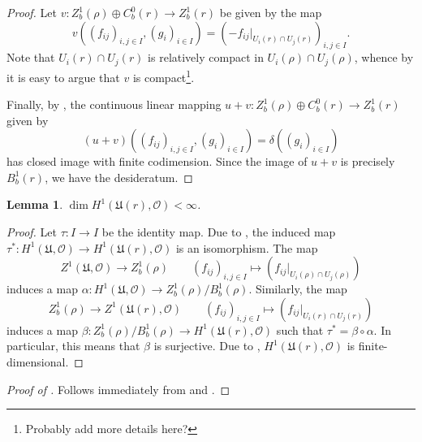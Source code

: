 \documentclass[10pt]{article}
\theoremstyle{thmstyle}
\newtheorem{lemma}[theorem]{Lemma}
\theoremstyle{defstyle}
\newcommand{\frakU}{\mathfrak{U}}
\newcommand{\scrO}{\mathscr{O}} %
\begin{document}
\begin{proof}
    Let $v: Z^1_b(\rho)\oplus C^0_b(r)\to Z^1_b(r)$ be given by the map 
    \begin{equation*}
        v\left((f_{ij})_{i,j\in I}, (g_i)_{i\in I}\right) = \left(-f_{ij}|_{U_i(r)\cap U_j(r)}\right)_{i,j\in I}.
    \end{equation*}
    Note that $U_i(r)\cap U_j(r)$ is relatively compact in $U_i(\rho)\cap U_j(\rho)$, whence by  it is easy to argue that $v$ is compact\footnote{Probably add more details here?}. 

    Finally, by , the continuous linear mapping $u + v : Z^1_b(\rho)\oplus C^0_b(r)\to Z^1_b(r)$ given by 
    \begin{equation*}
        (u + v)\left((f_{ij})_{i,j\in I}, (g_i)_{i\in I}\right) = \delta\left((g_i)_{i\in I}\right)
    \end{equation*}
    has closed image with finite codimension. Since the image of $u + v$ is precisely $B^1_b(r)$, we have the desideratum.
\end{proof}

\begin{lemma}
    $\dim H^1\left(\frakU(r),\scrO\right) < \infty$.
\end{lemma}
\begin{proof}
    Let $\tau: I\to I$ be the identity map. Due to , the induced map $\tau^\ast: H^1(\frakU,\scrO)\to H^1(\frakU(r),\scrO)$ is an isomorphism. The map 
    \begin{equation*}
        Z^1(\frakU,\scrO)\to Z^1_b(\rho)\qquad (f_{ij})_{i,j\in I}\longmapsto \left(f_{ij}|_{U_i(\rho)\cap U_j(\rho)}\right)
    \end{equation*}
    induces a map $\alpha: H^1(\frakU,\scrO)\to Z^1_b(\rho)/B^1_b(\rho)$. Similarly, the map 
    \begin{equation*}
        Z^1_b(\rho)\to Z^1(\frakU(r),\scrO)\qquad (f_{ij})_{i,j\in I}\longmapsto \left(f_{ij}|_{U_i(r)\cap U_j(r)}\right)
    \end{equation*}
    induces a map $\beta: Z^1_b(\rho)/B^1_b(\rho)\to H^1(\frakU(r),\scrO)$ such that $\tau^\ast = \beta\circ\alpha$. In particular, this means that $\beta$ is surjective. Due to , $H^1(\frakU(r),\scrO)$ is finite-dimensional.
\end{proof}

\begin{proof}[Proof of ]
    Follows immediately from  and .
\end{proof}
\end{document}

